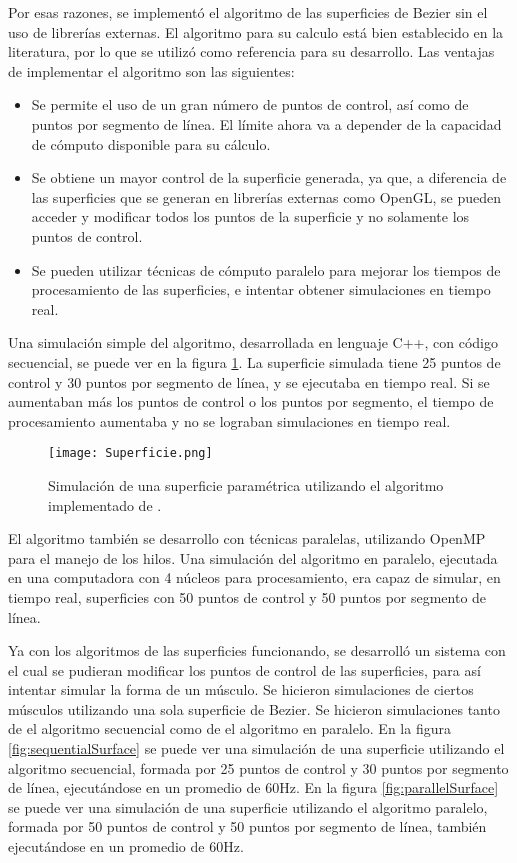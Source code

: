 Por esas razones, se implementó el algoritmo de las superficies de Bezier sin el uso de librerías externas. El algoritmo para su calculo está bien establecido en la literatura, por lo que se utilizó \cite{Rogers2001} como referencia para su desarrollo. Las ventajas de implementar el algoritmo son las siguientes:

\begin{itemize}
	\item Se permite el uso de un gran número de puntos de control, así como de puntos por segmento de línea. El límite ahora va a depender de la capacidad de cómputo disponible para su cálculo.
	\item Se obtiene un mayor control de la superficie generada, ya que, a diferencia de las superficies que se generan en librerías externas como OpenGL, se pueden acceder y modificar todos los puntos de la superficie y no solamente los puntos de control.
	\item Se pueden utilizar técnicas de cómputo paralelo para mejorar los tiempos de procesamiento de las superficies, e intentar obtener simulaciones en tiempo real.
\end{itemize}

Una simulación simple del algoritmo, desarrollada en lenguaje C++, con código secuencial, se puede ver en la figura \ref{fig:parametricSurface}. La superficie simulada tiene 25 puntos de control y 30 puntos por segmento de línea, y se ejecutaba en tiempo real. Si se aumentaban más los puntos de control o los puntos por segmento, el tiempo de procesamiento aumentaba y no se lograban simulaciones en tiempo real. 

\begin{figure}[!ht]
	\centering
		\texttt{[image: Superficie.png]}
	\caption[Simulación de superficie paramétrica.]{Simulación de una superficie paramétrica utilizando el algoritmo implementado de \cite{Rogers2001}.}
	\label{fig:parametricSurface}
\end{figure}

El algoritmo también se desarrollo con técnicas paralelas, utilizando OpenMP para el manejo de los hilos. Una simulación del algoritmo en paralelo, ejecutada en una computadora con 4 núcleos para procesamiento, era capaz de simular, en tiempo real, superficies con 50 puntos de control y 50 puntos por segmento de línea.

Ya con los algoritmos de las superficies funcionando, se desarrolló un sistema con el cual se pudieran modificar los puntos de control de las superficies, para así intentar simular la forma de un músculo. Se hicieron simulaciones de ciertos músculos utilizando una sola superficie de Bezier. Se hicieron simulaciones tanto de el algoritmo secuencial como de el algoritmo en paralelo. En la figura \ref{fig:sequentialSurface} se puede ver una simulación de una superficie utilizando el algoritmo secuencial, formada por 25 puntos de control y 30 puntos por segmento de línea, ejecutándose en un promedio de 60Hz. En la figura \ref{fig:parallelSurface} se puede ver una simulación de una superficie utilizando el algoritmo paralelo, formada por 50 puntos de control y 50 puntos por segmento de línea, también ejecutándose en un promedio de 60Hz.

